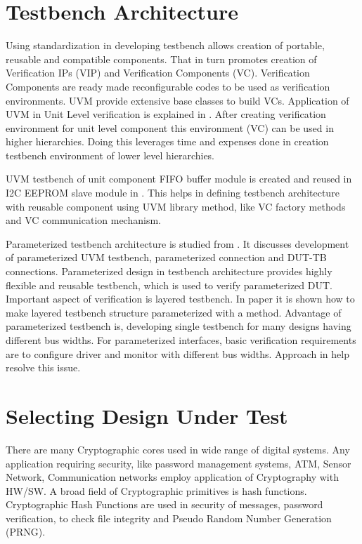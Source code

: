 \section{Testbench Architecture}

Using standardization in developing testbench allows creation of portable, reusable and compatible components. That in turn promotes creation of Verification IPs (VIP) and Verification Components (VC). Verification Components are ready made reconfigurable codes to be used as verification environments. UVM provide extensive base classes to build VCs. Application of UVM in Unit Level verification is explained in \cite{tbarch}. After creating verification environment for unit level component this environment (VC) can be used in higher hierarchies. Doing this leverages time and expenses done in creation testbench environment of lower level hierarchies. \par

UVM testbench of unit component FIFO buffer module is created and reused in I2C EEPROM slave module in \cite{tbarch}. This helps in defining testbench architecture with reusable component using UVM library method, like VC factory methods and VC communication mechanism. \par

Parameterized testbench architecture is studied from \cite{uvmparam}. It discusses development of parameterized UVM testbench, parameterized connection and DUT-TB connections. Parameterized design in testbench architecture provides highly flexible and reusable testbench, which is used to verify parameterized DUT. Important aspect of verification is layered testbench. In paper \cite{uvmparam} it is shown how to make layered testbench structure parameterized with a method. Advantage of parameterized testbench is, developing single testbench for many designs having different bus widths. For parameterized interfaces, basic verification requirements are to configure driver and monitor with different bus widths. Approach in \cite{uvmparam} help resolve this issue.

\section{Selecting Design Under Test}


There are many Cryptographic cores used in wide range of digital systems. Any application requiring security, like password management systems, ATM, Sensor Network, Communication networks employ application of Cryptography with HW/SW. A broad field of Cryptographic primitives is hash functions. Cryptographic Hash Functions are used in security of messages, password verification, to check file integrity and Pseudo Random Number Generation (PRNG). \par

